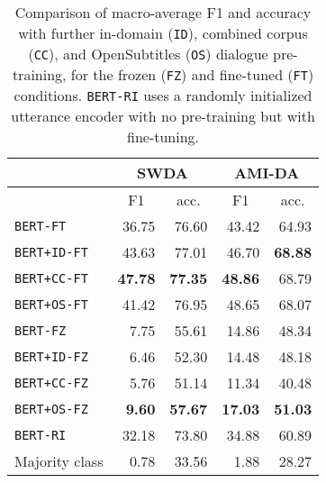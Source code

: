 \documentclass[11pt,a4paper]{article}
\begin{document}
\begin{table}[]
\begin{tabular}{@{}lrrrr@{}}
\toprule
           & \multicolumn{2}{c}{SWDA}                          & \multicolumn{2}{c}{AMI-DA}                        \\ \midrule
           & \multicolumn{1}{c}{F1} & \multicolumn{1}{c}{acc.} & \multicolumn{1}{c}{F1} & \multicolumn{1}{c}{acc.} \\
\texttt{BERT-FT}    & 36.75                  & 76.60                    & 43.42                  & 64.93                    \\
\texttt{BERT+ID-FT} & 43.63                  & 77.01                    & 46.70                  & \textbf{68.88}           \\
\texttt{BERT+CC-FT} & \textbf{47.78}         & \textbf{77.35}           & \textbf{48.86}         & 68.79                    \\ 
\texttt{BERT+OS-FT} & 41.42                  & 76.95                    & 48.65                  & 68.07                    \\ \midrule
\texttt{BERT-FZ}    &  7.75                  & 55.61           & 14.86                  & 48.34                    \\
\texttt{BERT+ID-FZ} &  6.46                  & 52.30                    & 14.48                  & 48.18                    \\
\texttt{BERT+CC-FZ} &  5.76                  & 51.14                    & 11.34                  & 40.48                    \\ 
\texttt{BERT+OS-FZ} &  \textbf{9.60}         & \textbf{57.67}           & \textbf{17.03}         & \textbf{51.03}           \\ \midrule
\texttt{BERT-RI} & 32.18           & 73.80                    & 34.88                  & 60.89                    \\ \midrule
    Majority class  & 0.78                   & 33.56                    &  1.88                  & 28.27      \\ \bottomrule
\end{tabular}
\caption{Comparison of macro-average F1 and accuracy with further in-domain (\texttt{ID}), combined corpus (\texttt{CC}), and OpenSubtitles (\texttt{OS}) dialogue pre-training,
for the frozen (\texttt{FZ}) and fine-tuned (\texttt{FT}) conditions. \texttt{BERT-RI} uses a randomly initialized utterance encoder with no pre-training but with fine-tuning.}
  \label{tab:results}
\end{table}
\end{document}
